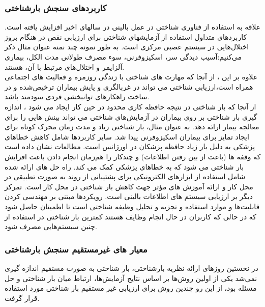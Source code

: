 \subsubsection{کاربرد‌های سنجش بارشناختی}
علاقه به استفاده از فناوری شناختی در عمل بالینی در سالهای اخیر افزایش یافته است. کاربردهای متداول استفاده از آزمایشهای شناختی برای ارزیابی نقص در هنگام بروز اختلال‌هایی در سیستم عصبی مرکزی است. به طور نمونه چند نمنه عنوان مثال ذکر می‌کنیم:آسیب دیدگی سر، اسکیزوفرنی، سوء مصرف طولانی مدت الکل، بیماری آلزایمر و اختلال‌های مرتبط با آن، هستند.
\\
علاوه بر این ، از آنجا که مهارت های شناختی با زندگی روزمره و فعالیت های اجتماعی همراه است،ارزیابی شناختی می تواند در غربالگری  و پایش بیماران ترخیص‌شده و در ساخت راهکارهای توانبخشی فردی سودمند باشد.
\\
از آنجا که بار شناختی در نتیجه حافظه کاری محدود در حین کار ایجاد می شود ، اندازه گیری بار شناختی بر روی بیماران در آزمایش‌های شناختی می تواند بینش هایی را برای معالجه بیمار ارائه دهد.
به عنوان مثال، بار شناختی زیاد و مدت زمان محرک کوتاه برای ایجاد تمایز برای بیماران اسکیزوفرنی پیدا شد.
سایر کاربردها شامل کاهش خطاهای پزشکی به دلیل بار زیاد حافظه پزشکان در اورژانس است.
مطالعات نشان داده است که وقفه ها (باعث از بین رفتن اطلاعات) و چندکار را هم‌زمان انجام دادن باعث افزایش بار شناختی می شود که به خطاهای پزشکی کمک می کند.
راه حل های ارائه شده شامل استفاده از ابزارهای الکترونیکی برای پشتیبانی از روند به صورت تطبیقی در محل کار و ارائه آموزش های مؤثر جهت کاهش بار شناختی در محل کار است.
تمرکز دیگر بر ارزیابی سیستم های اطلاعات بالینی است. رویکردها مبتنی بر مهندسی کردن قابلیت‌ها و موارد استفاده و   تجزیه و تحلیل وظیفه شناختی است تا اطمینان حاصل شود که  در حالی که کاربران در حال انجام وظایف هستند کمترین بار شناختی در استفاده از چنین سیستم‌هایی مصرف شود.
\subsubsection{معیار های غیرمستقیم سنجش بارشناختی}
در نخستین روزهای ارائه نظریه بارشناختی، بار شناختی به صورت مستقیم اندازه گیری نمی‌شد یکی از اولین روش‌ها بر اساس نتایج آزمایش‌ها،‌ ارتباط میان بار شناختی و حل مسئله بود، از این رو چندین روش برای ارزیابی غیر مستقیم بار شناختی مورد استفاده قرار گرفت.
\cite{sweller2011measuring}
